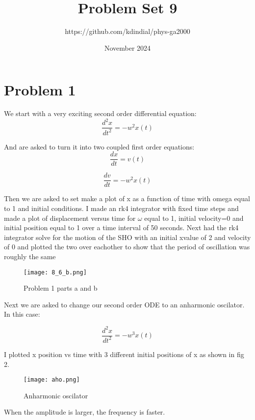 \documentclass{article}
\title{Problem Set 9}
\author{https://github.com/kdindial/phys-ga2000}
\date{November 2024}
\begin{document}
\maketitle

\section{Problem 1}
We start with a very exciting second order differential equation:
\begin{equation}
    \frac{d^2x}{dt^2}=-w^2x(t)
\end{equation}

And are asked to turn it into two coupled first order equations:
\begin{equation}
    \frac{dx}{dt}=v(t)
\end{equation}

\begin{equation}
    \frac{dv}{dt}=-w^2x(t)
\end{equation}

Then we are asked to set make a plot of x as a function of time with omega equal to 1 and initial conditions. I made an rk4 integrator with fixed time steps and made a plot of displacement versus time for $\omega$ equal to 1, initial velocity=0 and initial position equal to 1 over a time interval of 50 seconds. Next had the rk4 integrator solve for the motion of the SHO with an initial xvalue of 2 and velocity of 0 and plotted the two over eachother to show that the period of oscillation was roughly the same
\begin{figure}
    \centering
    \texttt{[image: 8\_6\_b.png]}
    \caption{Problem 1 parts a and b}
    \label{fig:1}
\end{figure}

Next we are asked to change our second order ODE to an anharmonic oscilator. In this case:


    \begin{equation}
    \frac{d^2x}{dt^2}=-w^3x(t)
    \end{equation}

I plotted x position vs time with 3 different initial positions of x as shown in fig 2.

\begin{figure}
    \centering
    \texttt{[image: aho.png]}
    \caption{Anharmonic oscilator}
    \label{fig:2}
\end{figure}

When the amplitude is larger, the frequency is faster.
\end{document}
